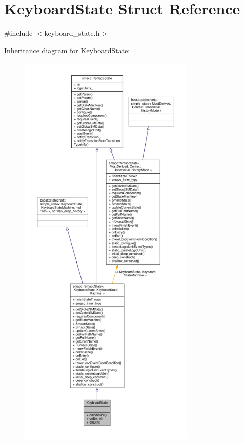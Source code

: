 \hypertarget{structKeyboardState}{}\section{Keyboard\+State Struct Reference}
\label{structKeyboardState}


{\ttfamily \#include $<$keyboard\+\_\+state.\+h$>$}



Inheritance diagram for Keyboard\+State\+:
\nopagebreak
\begin{figure}[H]
\begin{center}
\leavevmode
\includegraphics[height=550pt]{structKeyboardState__inherit__graph}
\end{center}
\end{figure}


